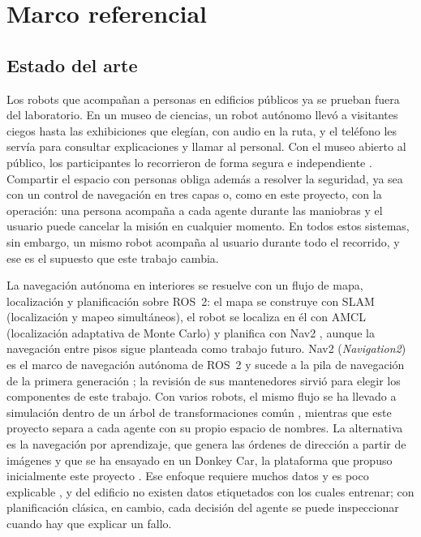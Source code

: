 \chapter{Marco referencial}
\label{cap:marco}

\section{Estado del arte}
\label{sec:antecedentes}

Los robots que acompañan a personas en edificios públicos ya se prueban fuera del laboratorio. En un museo de ciencias, un robot autónomo llevó a visitantes ciegos hasta las exhibiciones que elegían, con audio en la ruta, y el teléfono les servía para consultar explicaciones y llamar al personal. Con el museo abierto al público, los participantes lo recorrieron de forma segura e independiente \autocite{kayukawa2023enhancing}. Compartir el espacio con personas obliga además a resolver la seguridad, ya sea con un control de navegación en tres capas \autocite{omer2025multilayer} o, como en este proyecto, con la operación: una persona acompaña a cada agente durante las maniobras y el usuario puede cancelar la misión en cualquier momento. En todos estos sistemas, sin embargo, un mismo robot acompaña al usuario durante todo el recorrido, y ese es el supuesto que este trabajo cambia.

La navegación autónoma en interiores se resuelve con un flujo de mapa, localización y planificación sobre ROS~2: el mapa se construye con SLAM (localización y mapeo simultáneos), el robot se localiza en él con AMCL (localización adaptativa de Monte Carlo) y planifica con Nav2 \autocite{sojan2025autonomous}, aunque la navegación entre pisos sigue planteada como trabajo futuro. Nav2 (\textit{Navigation2}) es el marco de navegación autónoma de ROS~2 y sucede a la pila de navegación de la primera generación \autocite{macenski2020marathon}; la revisión de sus mantenedores \autocite{macenski2023survey} sirvió para elegir los componentes de este trabajo. Con varios robots, el mismo flujo se ha llevado a simulación dentro de un árbol de transformaciones común \autocite{varghese2023multirobot}, mientras que este proyecto separa a cada agente con su propio espacio de nombres. La alternativa es la navegación por aprendizaje, que genera las órdenes de dirección a partir de imágenes \autocite{zain2025obstacle} y que se ha ensayado en un Donkey Car, la plataforma que propuso inicialmente este proyecto \autocite{lopez2024enhancing}. Ese enfoque requiere muchos datos y es poco explicable \autocite{xiao2022motion}, y del edificio no existen datos etiquetados con los cuales entrenar; con planificación clásica, en cambio, cada decisión del agente se puede inspeccionar cuando hay que explicar un fallo.

